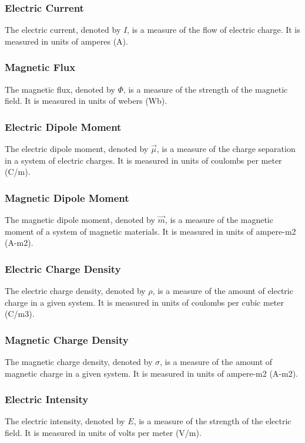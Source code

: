 \documentclass{article}
\begin{document}
\subsubsection{Electric Current} The electric current, denoted by $I$, is a
measure of the flow of electric charge. It is measured in units of amperes (A).

\subsubsection{Magnetic Flux} The magnetic flux, denoted by $\Phi$, is a measure
of the strength of the magnetic field. It is measured in units of webers (Wb).

\subsubsection{Electric Dipole Moment} The electric dipole moment, denoted by
$\vec{\mu}$, is a measure of the charge separation in a system of electric
charges. It is measured in units of coulombs per meter (C/m).

\subsubsection{Magnetic Dipole Moment} The magnetic dipole moment, denoted by
$\vec{m}$, is a measure of the magnetic moment of a system of magnetic
materials. It is measured in units of ampere-m2 (A-m2).

\subsubsection{Electric Charge Density} The electric charge density, denoted by
$\rho$, is a measure of the amount of electric charge in a given system. It is
measured in units of coulombs per cubic meter (C/m3).

\subsubsection{Magnetic Charge Density} The magnetic charge density, denoted by
$\sigma$, is a measure of the amount of magnetic charge in a given system. It
is measured in units of ampere-m2 (A-m2).

\subsubsection{Electric Intensity} The electric intensity, denoted by $E$, is a
measure of the strength of the electric field. It is measured in units of volts
per meter (V/m).
\end{document}

